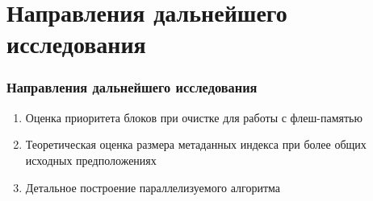 \documentclass[aspectratio=169, pdf, 8pt, unicode]{beamer}
\begin{document}
\section{Направления дальнейшего исследования}

\begin{frame}[fragile]
\frametitle{Направления дальнейшего исследования}
\begin{enumerate}
\item Оценка приоритета блоков при очистке для работы с флеш-памятью
\item Теоретическая оценка размера метаданных индекса при более общих
исходных предположениях
\item Детальное построение параллелизуемого алгоритма
\end{enumerate}
\end{frame}
\end{document}
